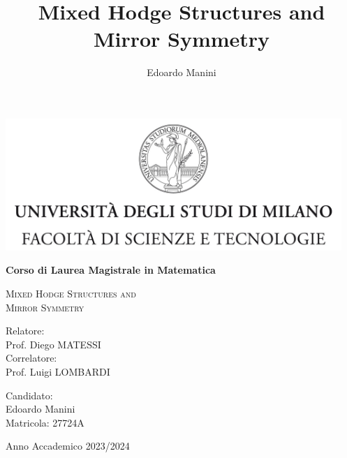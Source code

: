 \documentclass{article}
\title{Mixed Hodge Structures and Mirror Symmetry}
\author{Edoardo Manini}
\date{ }
\numberwithin{equation}{section}
\begin{document}
\begin{titlepage}
    \begin{center}
        \includegraphics[height=5cm]{tesiSCIENZE_TECNOLOGIE.jpg}
        \vspace*{0.5cm}

        \LARGE

        \textbf{Corso di Laurea Magistrale in Matematica}

        \vspace*{2cm}
        
        \huge
        \textsc{Mixed Hodge Structures and\\}
        \textsc{Mirror Symmetry}

        \normalsize
        \vspace*{4cm}

        \begin{minipage}[t]{0.47\textwidth}
	       {\large {Relatore:}} \vspace{0.3em} \\
              {\large {Prof. Diego MATESSI}} \vspace{1em} \\
	       {\large {Correlatore:}} \vspace{0.3em} \\
              {\large {Prof. Luigi LOMBARDI}} \vspace{1em}
        \end{minipage}
        \hfill
        \begin{minipage}[t]{0.47\textwidth}\raggedleft
	       {\large {Candidato:}} \hspace{-0.9em} \vspace{0.3em} \\
              {\large {Edoardo Manini}} \\
               {\large Matricola: 27724A}
        \end{minipage}

        \vfill
        \large Anno Accademico 2023/2024
            
    \end{center}
\end{titlepage}
\end{document}
